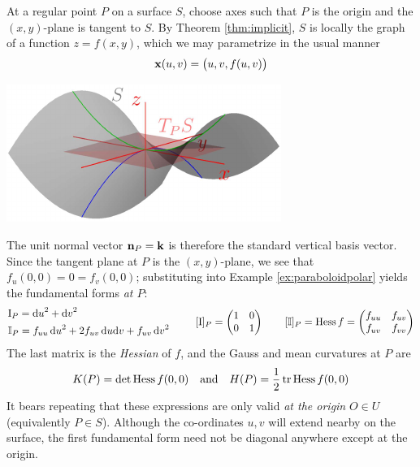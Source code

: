 \begin{minipage}[t]{0.63\linewidth}\vspace{0pt}
At a regular point $P$ on a surface $S$, choose axes such that $P$ is the origin and the $(x,y)$-plane is tangent\footnotemark{} to $S$. By Theorem \ref{thm:implicit}, $S$ is locally the graph of a function $z=f(x,y)$, which we may parametrize in the usual manner
\[{\mathbf{x}}(u,v)=\bigl(u,v,f(u,v)\bigr)\]
\end{minipage}\hfill\begin{minipage}[t]{0.36\linewidth}\vspace{0pt}
	\flushright\href{http://www.math.uci.edu/~ndonalds/math162a/euler-setup.html}{\includegraphics{euler-setup}}
\end{minipage}\par


The unit normal vector ${\mathbf{n}}_P={\mathbf{k}}$ is therefore the standard vertical basis vector. Since the tangent plane at $P$ is the $(x,y)$-plane, we see that $f_u(0,0)=0=f_v(0,0)$; substituting into Example \ref{ex:paraboloidpolar} yields the fundamental forms \emph{at $P$}:
\begin{gather*}
\begin{array}{@{}l}
\I_{P}=\du^2+\dv^2\\[4pt]
\II_{P}=f_{uu}\,\du^2+2f_{uv}\,\du\dv+f_{uv}\,\dv^2
\end{array}
\qquad
[\I]_{P}=\begin{pmatrix}
1&0\\0&1
\end{pmatrix}\qquad [\II]_P=\Hess f=\begin{pmatrix}
		f_{uu}&f_{uv}\\
		f_{uv}&f_{vv}
	\end{pmatrix}
\end{gather*}
The last matrix is the \emph{Hessian} of $f$, and the Gauss and mean curvatures at $P$ are
\[K(P)=\det\operatorname{Hess} f(0,0)\quad\text{and}\quad H(P)=\frac{1}{2}\operatorname{tr}\operatorname{Hess} f(0,0)\]
It bears repeating that these expressions are only valid \emph{at the origin} $O\in U$ (equivalently $P\in S$). Although the co-ordinates $u,v$ will extend nearby on the surface, the first fundamental form need not be diagonal anywhere except at the origin.\smallbreak

